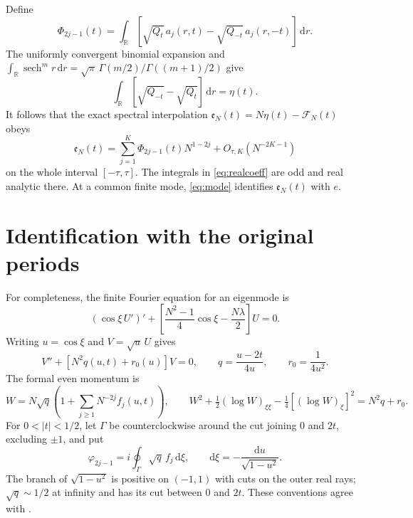\documentclass[10pt]{article}
\newcommand{\dd}{\mathrm d}
\newcommand{\sech}{\operatorname{sech}}
\newcommand{\ph}{\varphi}
\newcommand{\RR}{\mathbb R}
\begin{document}
Define
\begin{equation}
\Phi_{2j-1}(t)=\int_{\RR}
 [\sqrt{Q_t}\,a_j(r,t)-\sqrt{Q_{-t}}\,a_j(r,-t)]\,\dd r.
\label{eq:realcoeff}
\end{equation}
The uniformly convergent binomial expansion and
$\int_{\RR}\sech^m r\,\dd r=
\sqrt\pi\,\Gamma(m/2)/\Gamma((m+1)/2)$ give
\begin{equation}
\int_{\RR}[\sqrt{Q_{-t}}-\sqrt{Q_t}]\,\dd r=\eta(t).
\label{eq:leading}
\end{equation}
It follows that the exact spectral interpolation
$\mathfrak e_N(t)=N\eta(t)-\mathcal F_N(t)$ obeys
\begin{equation}
\mathfrak e_N(t)=\sum_{j=1}^K\Phi_{2j-1}(t)N^{1-2j}
 +O_{\tau,K}(N^{-2K-1})
\label{eq:preperiod}
\end{equation}
on the whole interval $[-\tau,\tau]$. The integrals in
\eqref{eq:realcoeff} are odd and real analytic there. At a common
finite mode, \eqref{eq:mode} identifies $\mathfrak e_N(t)$ with $e$.

\section{Identification with the original periods}\label{sec:periods}

For completeness, the finite Fourier equation for an eigenmode is
\[
(\cos\xi\,U')'+\left[\frac{N^2-1}{4}\cos\xi-\frac{N\lambda}2\right]U=0.
\]
Writing $u=\cos\xi$ and $V=\sqrt u\,U$ gives
\begin{equation}
V''+[N^2q(u,t)+r_0(u)]V=0,\qquad
q=\frac{u-2t}{4u},\qquad r_0=\frac1{4u^2}.
\label{eq:originalode}
\end{equation}
The formal even momentum is
\begin{equation}
W=N\sqrt q\left(1+\sum_{j\ge1}N^{-2j}f_j(u,t)\right),\qquad
W^2+\tfrac12(\log W)_{\xi\xi}
 -\tfrac14[(\log W)_\xi]^2=N^2q+r_0.
\label{eq:originalmomentum}
\end{equation}
For $0<|t|<1/2$, let $\Gamma$ be counterclockwise around the cut
joining $0$ and $2t$, excluding $\pm1$, and put
\begin{equation}
\ph_{2j-1}=i\oint_\Gamma\sqrt q\,f_j\,\dd\xi,
\qquad \dd\xi=-\frac{\dd u}{\sqrt{1-u^2}}.
\label{eq:perioddef}
\end{equation}
The branch of $\sqrt{1-u^2}$ is positive on $(-1,1)$ with cuts
on the outer real rays; $\sqrt q\sim1/2$ at infinity and has its
cut between $0$ and $2t$. These conventions agree with \cite{periods}.
\end{document}
